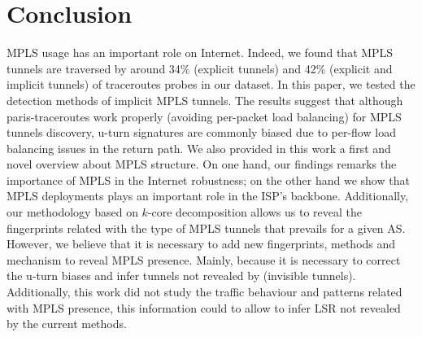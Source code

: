 \section{Conclusion}\label{ccl}

MPLS usage has an important role on Internet. Indeed, we found that MPLS
tunnels are traversed by around 34\% (explicit tunnels) and 42\% (explicit and implicit tunnels) of traceroutes probes in our dataset. In this paper, we tested the detection methods of implicit MPLS tunnels. The results suggest that although  paris-traceroutes work properly (avoiding per-packet load balancing) for MPLS tunnels discovery,  u-turn signatures are commonly biased due to per-flow load balancing issues in the return path. We also provided in this work a first and novel overview about MPLS structure. On one hand, our findings remarks the importance of MPLS in the Internet robustness; on the other hand we show that MPLS deployments plays an important role in the ISP's backbone.
Additionally, our methodology based on $k$-core decomposition allows us to reveal the fingerprints related with the type of MPLS tunnels that prevails for a given AS. However, we believe that it is necessary to add new fingerprints, methods and mechanism to reveal MPLS presence. Mainly, because it is necessary to correct the u-turn biases and infer tunnels not revealed by \traceroute (invisible tunnels). Additionally, this work did not study the traffic behaviour and patterns related with MPLS presence, this information could to allow to infer LSR not revealed by the current methods.

